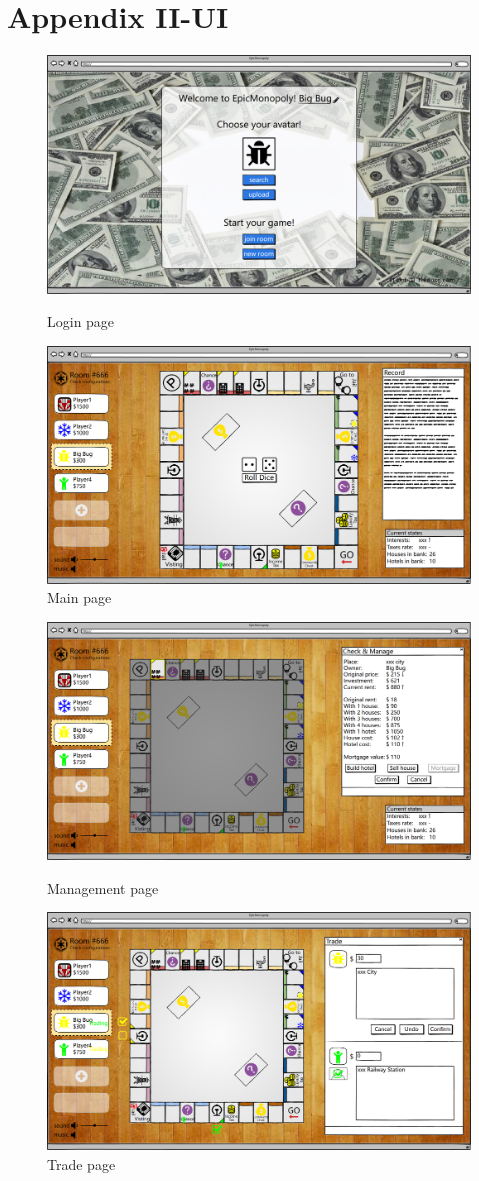 \documentclass[a4paper,12pt]{article}
\begin{document}
\section*{Appendix II-UI}
\begin{figure}[htbp]
\includegraphics[scale=0.18]{image/pre_game_setting.png}
\caption{Login page}

\includegraphics[scale=0.18]{image/in_game_main.png}
\caption{Main page}

\end{figure}
\begin{figure}[htbp]
\includegraphics[scale=0.18]{image/in_game_management.png}
\caption{Management page}
\includegraphics[scale=0.18]{image/in_game_trading.png}
\caption{Trade page}
\end{figure}
\end{document}
